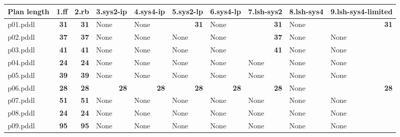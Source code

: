 \documentclass{article}
\begin{document}
\begin{tabular}{@{}lrrrrrrrrr@{}}
Plan length & 1.ff & 2.rb & 3.sys2-ip & 4.sys4-ip & 5.sys2-lp & 6.sys4-lp & 7.lsh-sys2 & 8.lsh-sys4 & 9.lsh-sys4-limited \\
\midrule
p01.pddl & \textbf{31} & \textbf{31} & \multicolumn{1}{|l|}{None} & \multicolumn{1}{|l|}{None} & \textbf{31} & \multicolumn{1}{|l|}{None} & \textbf{31} & \multicolumn{1}{|l|}{None} & \textbf{31} \\
p02.pddl & \textbf{37} & \textbf{37} & \multicolumn{1}{|l|}{None} & \multicolumn{1}{|l|}{None} & \multicolumn{1}{|l|}{None} & \multicolumn{1}{|l|}{None} & \textbf{37} & \multicolumn{1}{|l|}{None} & \multicolumn{1}{|l|}{None} \\
p03.pddl & \textbf{41} & \textbf{41} & \multicolumn{1}{|l|}{None} & \multicolumn{1}{|l|}{None} & \multicolumn{1}{|l|}{None} & \multicolumn{1}{|l|}{None} & \textbf{41} & \multicolumn{1}{|l|}{None} & \multicolumn{1}{|l|}{None} \\
p04.pddl & \textbf{24} & \textbf{24} & \multicolumn{1}{|l|}{None} & \multicolumn{1}{|l|}{None} & \multicolumn{1}{|l|}{None} & \multicolumn{1}{|l|}{None} & \multicolumn{1}{|l|}{None} & \multicolumn{1}{|l|}{None} & \multicolumn{1}{|l|}{None} \\
p05.pddl & \textbf{39} & \textbf{39} & \multicolumn{1}{|l|}{None} & \multicolumn{1}{|l|}{None} & \multicolumn{1}{|l|}{None} & \multicolumn{1}{|l|}{None} & \multicolumn{1}{|l|}{None} & \multicolumn{1}{|l|}{None} & \multicolumn{1}{|l|}{None} \\
p06.pddl & \textbf{28} & \textbf{28} & \textbf{28} & \textbf{28} & \textbf{28} & \textbf{28} & \textbf{28} & \multicolumn{1}{|l|}{None} & \textbf{28} \\
p07.pddl & \textbf{51} & \textbf{51} & \multicolumn{1}{|l|}{None} & \multicolumn{1}{|l|}{None} & \multicolumn{1}{|l|}{None} & \multicolumn{1}{|l|}{None} & \multicolumn{1}{|l|}{None} & \multicolumn{1}{|l|}{None} & \multicolumn{1}{|l|}{None} \\
p08.pddl & \textbf{24} & \textbf{24} & \multicolumn{1}{|l|}{None} & \multicolumn{1}{|l|}{None} & \multicolumn{1}{|l|}{None} & \multicolumn{1}{|l|}{None} & \multicolumn{1}{|l|}{None} & \multicolumn{1}{|l|}{None} & \multicolumn{1}{|l|}{None} \\
p09.pddl & \textbf{95} & \textbf{95} & \multicolumn{1}{|l|}{None} & \multicolumn{1}{|l|}{None} & \multicolumn{1}{|l|}{None} & \multicolumn{1}{|l|}{None} & \multicolumn{1}{|l|}{None} & \multicolumn{1}{|l|}{None} & \multicolumn{1}{|l|}{None} \\

\end{tabular}
\end{document}
